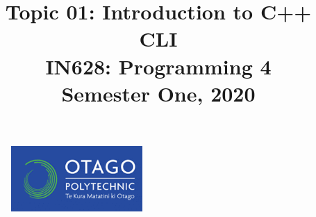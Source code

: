 \documentclass{article}
\author{}
\begin{document}
\begin{figure}
  \includegraphics[width=50mm]{../../resources/img/logo.png}
\end{figure}

\title{Topic 01: Introduction to C++ CLI\\IN628: Programming 4\\Semester One, 2020}
\date{}
\maketitle
\end{document}
